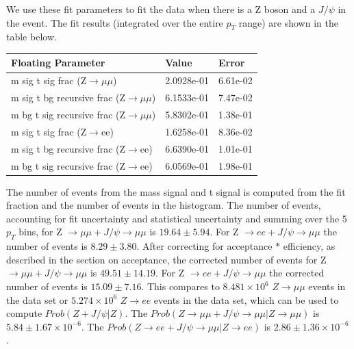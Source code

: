 \documentclass[a4paper,12pt]{article}
\begin{document}
We use these fit parameters to fit the data when there is a Z boson and a $J\slash \psi$ in the event. The fit results (integrated over the entire $p_{T}$ range) are shown in the table below.
\begin{center}
  \begin{tabular}{ | l | l | l | }
      \hline
      Floating Parameter                                 &  Value      & Error    \\ \hline
      m sig t sig frac (Z$\rightarrow\mu\mu$)            &  2.0928e-01 & 6.61e-02 \\ \hline
      m sig t bg recursive frac (Z$\rightarrow\mu\mu$)   &  6.1533e-01 & 7.47e-02 \\ \hline
      m bg t sig recursive frac (Z$\rightarrow\mu\mu$)   &  5.8302e-01 & 1.38e-01 \\ \hline
      m sig t sig frac (Z$\rightarrow$ee)                &  1.6258e-01 & 8.36e-02 \\ \hline
      m sig t bg recursive frac (Z$\rightarrow$ee)       &  6.6390e-01 & 1.01e-01 \\ \hline
      m bg t sig recursive frac (Z$\rightarrow$ee)       &  6.0569e-01 & 1.98e-01 \\ \hline
      \hline
  \end{tabular}
\end{center}

The number of events from the mass signal and t signal is computed from the fit fraction and the number of events in the histogram. The number of events, accounting for fit uncertainty and statistical uncertainty and summing over the 5 $p_T$ bins, for Z $\rightarrow\mu\mu + J\slash \psi \rightarrow\mu\mu $ is $19.64 \pm 5.94$. For Z $\rightarrow ee + J\slash \psi \rightarrow\mu\mu$ the number of events is $8.29 \pm 3.80 $. After correcting for acceptance $\ast$ efficiency, as described in the section on acceptance, the corrected number of events for Z $\rightarrow\mu\mu + J\slash \psi \rightarrow\mu\mu $ is $49.51 \pm 14.19$. For Z $\rightarrow ee + J\slash \psi \rightarrow\mu\mu$ the corrected number of events is $15.09 \pm 7.16$. This compares to $8.481 \times 10^{6}$ $Z \rightarrow\mu\mu$ events in the data set or $5.274 \times 10^{6}$  $Z\rightarrow ee$ events in the data set, which can be used to compute $Prob(Z + J\slash \psi | Z)$. The $Prob(Z\rightarrow\mu\mu + J\slash \psi\rightarrow\mu\mu | Z\rightarrow\mu\mu)$ is $5.84 \pm 1.67 \times 10^{-6}$. The $Prob(Z\rightarrow ee + J\slash \psi\rightarrow\mu\mu | Z\rightarrow ee)$ is $2.86 \pm 1.36 \times 10^{-6}$.
\end{document}
